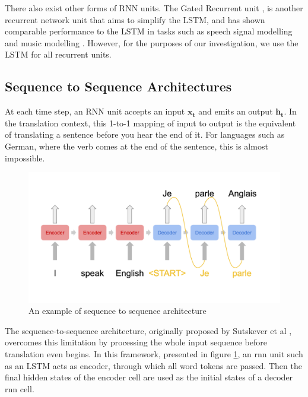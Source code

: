 There also exist other forms of RNN units. The Gated Recurrent unit \cite{cho_properties_2014}, is another recurrent network unit that aims to simplify the LSTM, and has shown comparable performance to the LSTM in tasks such as speech signal modelling and music modelling \cite{chung_empirical_2014}.
However, for the purposes of our investigation, we use the LSTM for all recurrent units.


\subsection{Sequence to Sequence Architectures} %
\label{sub:sequence_to_sequence_architectures}

At each time step, an RNN unit accepts an input $\mathbf{x_t}$ and emits an output $\mathbf{h_t}$. In the translation context, this 1-to-1 mapping of input to output is the equivalent of translating a sentence before you hear the end of it. For languages such as German, where the verb comes at the end of the sentence, this is almost impossible.

\begin{figure}[tb]
    \centering
    \includegraphics[width=\linewidth]{ModelPics/seq2seq.png}
    \caption{An example of sequence to sequence architecture}
    \label{fig:seqtoseq}
\end{figure}

The sequence-to-sequence architecture, originally proposed by Sutskever et al \cite{sutskever_sequence_2014}, overcomes this limitation by processing the whole input sequence before translation even begins. 
In this framework, presented in figure \ref{fig:seqtoseq}, an rnn unit such as an LSTM acts as encoder, through which all word tokens are passed. Then the final hidden states of the encoder cell are used as the initial states of a decoder rnn cell.

